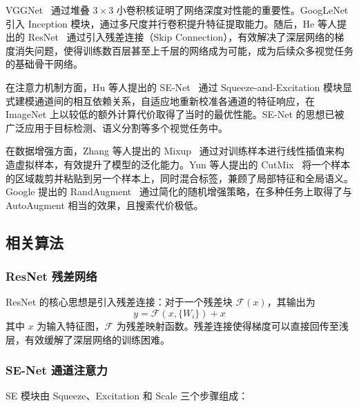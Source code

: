 \documentclass[12pt,a4paper]{ctexart}
\begin{document}
VGGNet~\cite{simonyan2014very} 通过堆叠 $3\times3$ 小卷积核证明了网络深度对性能的重要性。GoogLeNet 引入 Inception 模块，通过多尺度并行卷积提升特征提取能力。随后，He 等人提出的 ResNet~\cite{he2016deep} 通过引入残差连接（Skip Connection），有效解决了深层网络的梯度消失问题，使得训练数百层甚至上千层的网络成为可能，成为后续众多视觉任务的基础骨干网络。

在注意力机制方面，Hu 等人提出的 SE-Net~\cite{hu2018squeeze} 通过 Squeeze-and-Excitation 模块显式建模通道间的相互依赖关系，自适应地重新校准各通道的特征响应，在 ImageNet 上以较低的额外计算代价取得了当时的最优性能。SE-Net 的思想已被广泛应用于目标检测、语义分割等多个视觉任务中。

在数据增强方面，Zhang 等人提出的 Mixup~\cite{zhang2018mixup} 通过对训练样本进行线性插值来构造虚拟样本，有效提升了模型的泛化能力。Yun 等人提出的 CutMix~\cite{yun2019cutmix} 将一个样本的区域裁剪并粘贴到另一个样本上，同时混合标签，兼顾了局部特征和全局语义。Google 提出的 RandAugment~\cite{cubuk2020randaugment} 通过简化的随机增强策略，在多种任务上取得了与 AutoAugment 相当的效果，且搜索代价极低。

\subsection{相关算法}

\subsubsection{ResNet 残差网络}

ResNet 的核心思想是引入残差连接：对于一个残差块 $\mathcal{F}(x)$，其输出为
\begin{equation}
    y = \mathcal{F}(x, \{W_i\}) + x
\end{equation}
其中 $x$ 为输入特征图，$\mathcal{F}$ 为残差映射函数。残差连接使得梯度可以直接回传至浅层，有效缓解了深层网络的训练困难。

\subsubsection{SE-Net 通道注意力}

SE 模块由 Squeeze、Excitation 和 Scale 三个步骤组成：
\end{document}
